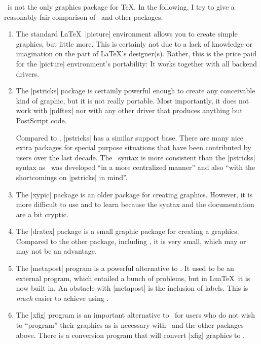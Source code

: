 \tikzname\ is not the only graphics package for \TeX. In the following, I try
to give a reasonably fair comparison of \tikzname\ and other packages.
%
\begin{enumerate}
    \item The standard \LaTeX\ |{picture}| environment allows you to create
        simple graphics, but little more. This is certainly not due to a lack
        of knowledge or imagination on the part of \LaTeX's designer(s).
        Rather, this is the price paid for the |{picture}| environment's
        portability: It works together with all backend drivers.
    \item The |pstricks| package is certainly powerful enough to create any
        conceivable kind of graphic, but it is not really portable. Most
        importantly, it does not work with |pdftex| nor with any other driver
        that produces anything but PostScript code.

        Compared to \tikzname, |pstricks| has a similar support base. There
        are many nice extra packages for special purpose situations that have
        been contributed by users over the last decade. The \tikzname\ syntax
        is more consistent than the |pstricks| syntax as \tikzname\ was
        developed ``in a more centralized manner'' and also ``with the
        shortcomings on |pstricks| in mind''.
    \item The |xypic| package is an older package for creating graphics.
        However, it is more difficult to use and to learn because the syntax
        and the documentation are a bit cryptic.
    \item The |dratex| package is a small graphic package for creating a
        graphics. Compared to the other package, including \tikzname, it is
        very small, which may or may not be an advantage.
    \item The |metapost| program is a powerful alternative to \tikzname. It
        used to be an external program, which entailed a bunch of problems,
        but in Lua\TeX\ it is now built in. An obstacle with |metapost| is
        the inclusion of labels. This is \emph{much} easier to achieve using
        \pgfname.
    \item The |xfig| program is an important alternative to \tikzname\ for
        users who do not wish to ``program'' their graphics as is necessary
        with \tikzname\ and the other packages above. There is a conversion
        program that will convert |xfig| graphics to \tikzname.
\end{enumerate}


